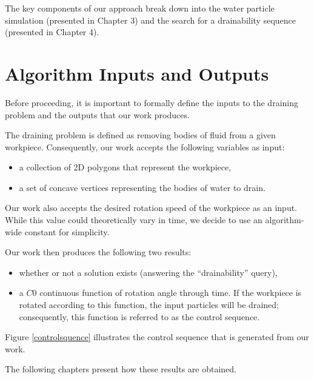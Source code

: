 The key components of our approach break down into the water particle simulation (presented in Chapter 3) and the search for a drainability sequence (presented in Chapter 4).

\section{Algorithm Inputs and Outputs}

Before proceeding, it is important to formally define the inputs to the draining problem and the outputs that our work produces.

The draining problem is defined as removing bodies of fluid from a given workpiece. Consequently, our work accepts the following variables as input:

\begin{itemize}
\item a collection of 2D polygons that represent the workpiece,
\item a set of concave vertices representing the bodies of water to drain.
\end{itemize}

Our work also accepts the desired rotation speed of the workpiece as an input. While this value could theoretically vary in time, we decide to use an algorithm-wide constant for simplicity.

Our work then produces the following two results:

\begin{itemize}
\item whether or not a solution exists (answering the ``drainability'' query),
\item a $C0$ continuous function of rotation angle through time. If the workpiece is rotated according to this function, the input particles will be drained; consequently, this function is referred to as the control sequence.
\end{itemize}

Figure \ref{controlsquence} illustrates the control sequence that is generated from our work.


The following chapters present how these results are obtained.

